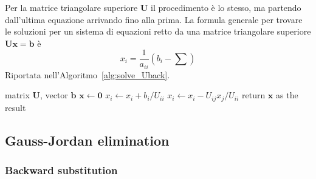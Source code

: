 \documentclass[10pt]{article}
\begin{document}
Per la matrice triangolare superiore $\mathbf{U}$ il procedimento è lo stesso, ma partendo dall'ultima equazione arrivando fino alla prima.
La formula generale per trovare le soluzioni per un sistema di equazioni retto da una matrice triangolare superiore $\mathbf{Ux}=\mathbf{b}$ è
\begin{equation}
x_i = \frac{1}{a_{ii}} \left( b_i - \sum \right)
\end{equation}
Riportata nell'Algoritmo~\ref{alg:solve_Uback}.

\begin{algorithm}
\caption{Solve $\mathbf{Ux}=\mathbf{b}$ (backward). \textcolor{red}{gli indici dei for sono sbagliati!!}}\label{alg:solve_Uback}
\begin{algorithmic}[1]
\Require matrix $\mathbf{U}$, vector $\mathbf{b}$ 
\State $\mathbf{x} \gets \mathbf{0}$ 
 
	\State $x_i \gets x_i + {b_i}/{U_{ii}}$
	 
		\State $x_i \gets x_i - U_{ij}x_j / U_{ii}$
	\EndFor
\EndFor
\State return $\mathbf{x}$ as the result
\end{algorithmic}
\end{algorithm}



\subsection{Gauss-Jordan elimination}


\subsubsection{Backward substitution}
\end{document}
